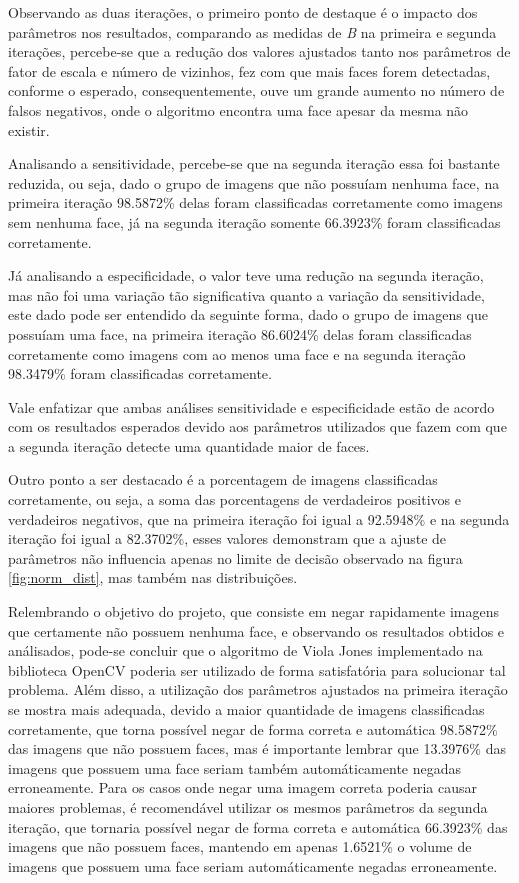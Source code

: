 Observando as duas iterações, o primeiro ponto de destaque é o impacto dos parâmetros nos resultados, comparando as medidas de \textit{B} na primeira e segunda iterações, percebe-se que a redução dos valores ajustados tanto nos parâmetros de fator de escala e número de vizinhos, fez com que mais faces forem detectadas, conforme o esperado, consequentemente, ouve um grande aumento no número de falsos negativos, onde o algoritmo encontra uma face apesar da mesma não existir. 

Analisando a sensitividade, percebe-se que na segunda iteração essa foi bastante reduzida, ou seja, dado o grupo de imagens que não possuíam nenhuma face, na primeira iteração 98.5872\% delas foram classificadas corretamente como imagens sem nenhuma face, já na segunda iteração somente 66.3923\% foram classificadas corretamente.

Já analisando a especificidade, o valor teve uma redução na segunda iteração, mas não foi uma variação tão significativa quanto a variação da sensitividade, este dado pode ser entendido da seguinte forma, dado o grupo de imagens que possuíam uma face, na primeira iteração 86.6024\% delas foram classificadas corretamente como imagens com ao menos uma face e na segunda iteração 98.3479\% foram classificadas corretamente.

Vale enfatizar que ambas análises sensitividade e especificidade estão de acordo com os resultados esperados devido aos parâmetros utilizados que fazem com que a segunda iteração detecte uma quantidade maior de faces.

Outro ponto a ser destacado é a porcentagem de imagens classificadas corretamente, ou seja, a soma das porcentagens de verdadeiros positivos e verdadeiros negativos, que na primeira iteração foi igual a 92.5948\% e na segunda iteração foi igual a 82.3702\%, esses valores demonstram que a ajuste de parâmetros não influencia apenas no limite de decisão observado na figura \ref{fig:norm_dist}, mas também nas distribuições.

Relembrando o objetivo do projeto, que consiste em negar rapidamente imagens que certamente não possuem nenhuma face, e observando os resultados obtidos e análisados, pode-se concluir que o algoritmo de Viola Jones implementado na biblioteca OpenCV poderia ser utilizado de forma satisfatória para solucionar tal problema. Além disso, a utilização dos parâmetros ajustados na primeira iteração se mostra mais adequada, devido a maior quantidade de imagens classificadas corretamente, que torna possível negar de forma correta e automática 98.5872\% das imagens que não possuem faces, mas é importante lembrar que 13.3976\% das imagens que possuem uma face seriam também automáticamente negadas erroneamente. Para os casos onde negar uma imagem correta poderia causar maiores problemas, é recomendável utilizar os mesmos parâmetros da segunda iteração, que tornaria possível negar de forma correta e automática 66.3923\% das imagens que não possuem faces, mantendo em apenas 1.6521\% o volume de imagens que possuem uma face seriam  automáticamente negadas erroneamente.